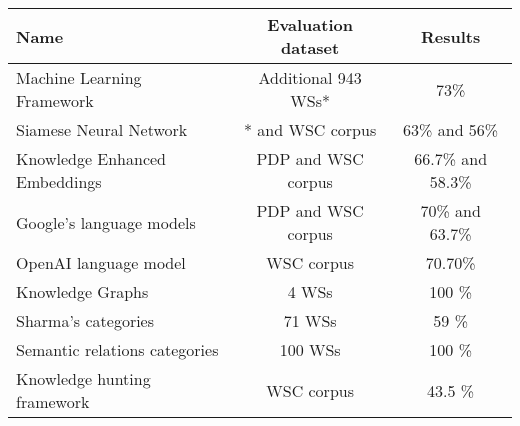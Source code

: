 %

\begin{tabular}{  l | c | c  }
   
    \textbf{Name}  & \textbf{Evaluation dataset } &\textbf{Results}\\ \hline
    Machine Learning Framework & Additional 943 WSs* & 73\% \\\hline
    Siamese Neural Network  & * and WSC corpus & 63\% and 56\% \\\hline
    Knowledge Enhanced Embeddings & PDP and WSC corpus  & 66.7\% and 58.3\% \\\hline
    Google's language models  & PDP and WSC corpus & 70\% and 63.7\% \\\hline
    OpenAI language model & WSC corpus & 70.70\% \\\Xhline{3\arrayrulewidth}
    Knowledge Graphs  & 4 WSs & 100 \%\\\hline
    Sharma's categories  & 71 WSs & 59 \% \\\hline
    Semantic relations categories  & 100 WSs& 100 \% \\\hline
    Knowledge hunting framework & WSC corpus & 43.5 \% \\\hline
\end{tabular}

%